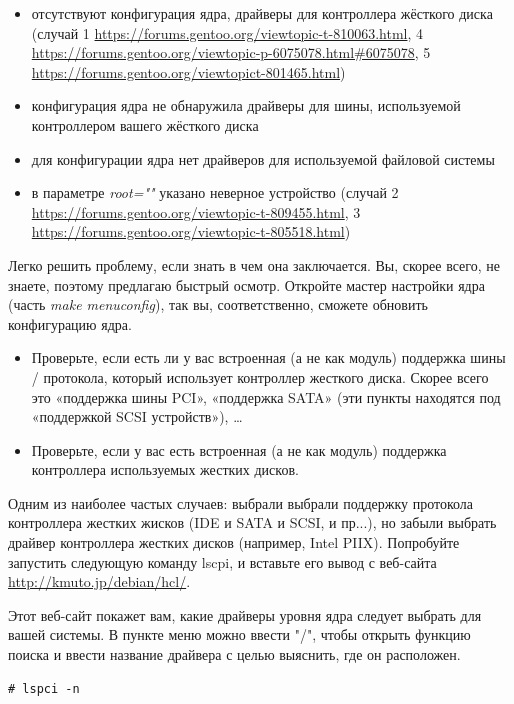 \documentclass[10pt]{book}
\begin{document}
\begin{itemize}
\item отсутствуют конфигурация ядра, драйверы для контроллера жёсткого диска (случай 1 \url{https://forums.gentoo.org/viewtopic-t-810063.html}, 4 \url{https://forums.gentoo.org/viewtopic-p-6075078.html#6075078}, 5 \url{https://forums.gentoo.org/viewtopict-801465.html})
\item конфигурация ядра не обнаружила драйверы для шины, используемой контроллером вашего жёсткого диска
\item для конфигурации ядра нет драйверов для используемой файловой системы
\item в параметре\textit{ root=""} указано неверное устройство (случай 2 \url{https://forums.gentoo.org/viewtopic-t-809455.html}, 3 \url{https://forums.gentoo.org/viewtopic-t-805518.html})
\end{itemize}

Легко решить проблему, если знать в чем она заключается. Вы, скорее всего, не знаете, поэтому предлагаю быстрый осмотр.
Откройте мастер настройки ядра (часть \textit{make menuconfig}), так вы, соответственно, сможете обновить конфигурацию ядра.

\begin{itemize}
\item Проверьте, если есть ли у вас встроенная (а не как модуль) поддержка шины / протокола, который использует контроллер жесткого диска.
Скорее всего это «поддержка шины PCI», «поддержка SATA» (эти пункты находятся под «поддержкой SCSI устройств»), …
\item Проверьте, если у вас есть встроенная (а не как модуль) поддержка контроллера используемых жестких дисков.
\end{itemize}

Одним из наиболее частых случаев: выбрали выбрали поддержку протокола контроллера жестких жисков (IDE и SATA и SCSI, и пр...), но забыли выбрать драйвер контроллера жестких дисков (например, Intel PIIX). Попробуйте запустить следующую команду lscpi, и вставьте его вывод  с веб-сайта \url{http://kmuto.jp/debian/hcl/}. 

Этот веб-сайт покажет вам, какие драйверы уровня ядра следует выбрать для вашей системы. В пункте меню можно ввести "/", чтобы открыть функцию поиска и ввести название драйвера с целью выяснить, где он расположен.

\begin{tcolorbox}
\begin{lstlisting}
# lspci -n
\end{lstlisting}
\end{tcolorbox}
\end{document}
